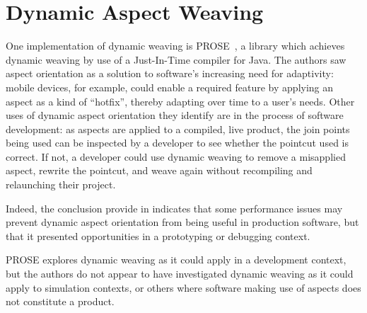 

\section{Dynamic Aspect Weaving}\label{sec:dynamic_aop_review}

One implementation of dynamic weaving is
PROSE~\cite{popovici2002PROSE,popovici2003JITaspects}, a library which achieves
dynamic weaving by use of a Just-In-Time compiler for Java. The authors saw
aspect orientation as a solution to software's increasing need for adaptivity:
mobile devices, for example, could enable a required feature by applying an
aspect as a kind of ``hotfix'', thereby adapting over time to a user's needs.
Other uses of dynamic aspect orientation they identify are in the process of
software development: as aspects are applied to a compiled, live product, the
join points being used can be inspected by a developer to see whether the
pointcut used is correct. If not, a developer could use dynamic weaving to
remove a misapplied aspect, rewrite the pointcut, and weave again without
recompiling and relaunching their project.

Indeed, the conclusion \citeauthor{popovici2003JITaspects} provide in
\cite{popovici2003JITaspects} indicates that some performance issues 
may prevent
dynamic aspect orientation from being useful in production software, but that
it presented opportunities in a prototyping or debugging context.

PROSE explores dynamic weaving as it could apply in a development context, but
the authors do not appear to have investigated dynamic weaving as it could apply
to simulation contexts, or others where software making use of aspects does not
constitute a product.

